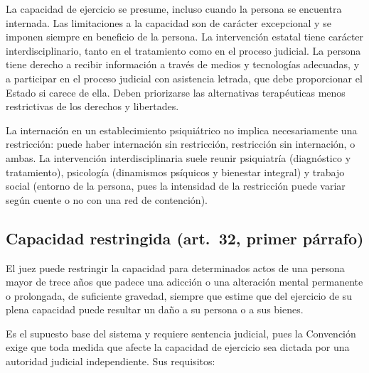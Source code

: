 \documentclass[12pt,oneside]{book}
\begin{document}
\begin{regla}
La capacidad de ejercicio se presume, incluso cuando la persona se encuentra internada. Las limitaciones a la capacidad son de carácter excepcional y se imponen siempre en beneficio de la persona. La intervención estatal tiene carácter interdisciplinario, tanto en el tratamiento como en el proceso judicial. La persona tiene derecho a recibir información a través de medios y tecnologías adecuadas, y a participar en el proceso judicial con asistencia letrada, que debe proporcionar el Estado si carece de ella. Deben priorizarse las alternativas terapéuticas menos restrictivas de los derechos y libertades.
\end{regla}

La internación en un establecimiento psiquiátrico no implica necesariamente una restricción: puede haber internación sin restricción, restricción sin internación, o ambas. La intervención interdisciplinaria suele reunir psiquiatría (diagnóstico y tratamiento), psicología (dinamismos psíquicos y bienestar integral) y trabajo social (entorno de la persona, pues la intensidad de la restricción puede variar según cuente o no con una red de contención).

\subsection{Capacidad restringida (art.~32, primer párrafo)}

\begin{regla}
El juez puede restringir la capacidad para determinados actos de una persona mayor de trece años que padece una adicción o una alteración mental permanente o prolongada, de suficiente gravedad, siempre que estime que del ejercicio de su plena capacidad puede resultar un daño a su persona o a sus bienes.
\end{regla}

Es el supuesto base del sistema y requiere sentencia judicial, pues la Convención exige que toda medida que afecte la capacidad de ejercicio sea dictada por una autoridad judicial independiente. Sus requisitos:
\end{document}
